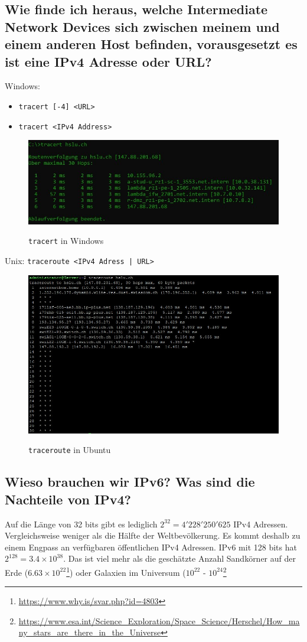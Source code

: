 \subsection*{Wie finde ich heraus, welche Intermediate Network Devices sich zwischen meinem und einem anderen Host befinden, vorausgesetzt es ist eine IPv4 Adresse oder URL?}
\begin{multicols}{2}
    Windows:
    \begin{itemize}
        \item \texttt{tracert [-4] <URL>}
        \item \texttt{tracert <IPv4 Address>}
    \end{itemize}
    \begin{figure}[H]
        \begin{center}
        \label{pic:tracert}
        \includegraphics[width=.5\textwidth]{images/tracert.jpg}
        \caption{\texttt{tracert} in Windows}
        \end{center}
    \end{figure}
    \columnbreak
    Unix: \texttt{traceroute <IPv4 Adress | URL>}
    \begin{figure}[H]
        \begin{center}
        \label{pic:traceroute}
        \includegraphics[width=.5\textwidth]{images/traceroute.jpg}
        \caption{\texttt{traceroute} in Ubuntu}
        \end{center}
    \end{figure}
\end{multicols}

\subsection*{Wieso brauchen wir IPv6? Was sind die Nachteile von IPv4?}
Auf die Länge von 32 bits gibt es lediglich $2^{32}=4'228'250'625$ IPv4 Adressen. Vergleichsweise weniger als die Hälfte der Weltbevölkerung. Es kommt deshalb zu einem Engpass an verfügbaren öffentlichen IPv4 Adressen. IPv6 mit 128 bits hat $2^{128}=3.4\times10^{38}$. Das ist viel mehr als die geschätzte Anzahl Sandkörner auf der Erde ($6.63\times10^{22}$\footnote{\url{https://www.why.is/svar.php?id=4803}}) oder Galaxien im Universum ($10^{22}$ - $10^{24}$\footnote{\url{https://www.esa.int/Science_Exploration/Space_Science/Herschel/How_many_stars_are_there_in_the_Universe}}

